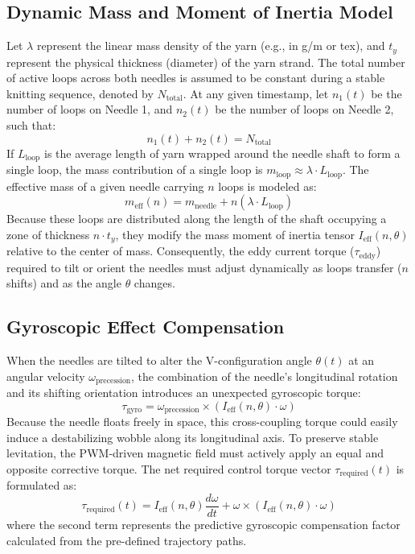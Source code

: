 \documentclass[10pt]{article}
\begin{document}
\subsection{Dynamic Mass and Moment of Inertia Model}
Let $\lambda$ represent the linear mass density of the yarn (e.g., in g/m or tex), and $t_y$ represent the physical thickness (diameter) of the yarn strand. The total number of active loops across both needles is assumed to be constant during a stable knitting sequence, denoted by $N_{\mathrm{total}}$. At any given timestamp, let $n_1(t)$ be the number of loops on Needle 1, and $n_2(t)$ be the number of loops on Needle 2, such that:
\begin{equation}
n_1(t)+n_2(t)=N_{\mathrm{total}}
\tag{2}
\end{equation}
If $L_{\mathrm{loop}}$ is the average length of yarn wrapped around the needle shaft to form a single loop, the mass contribution of a single loop is $m_{\mathrm{loop}}\approx\lambda\cdot L_{\mathrm{loop}}$. The effective mass of a given needle carrying $n$ loops is modeled as:
\begin{equation}
m_{\mathrm{eff}}(n)=m_{\mathrm{needle}}+n(\lambda\cdot L_{\mathrm{loop}})
\tag{3}
\end{equation}
Because these loops are distributed along the length of the shaft occupying a zone of thickness $n\cdot t_y$, they modify the mass moment of inertia tensor $I_{\mathrm{eff}}(n,\theta)$ relative to the center of mass. Consequently, the eddy current torque ($\tau_{\mathrm{eddy}}$) required to tilt or orient the needles must adjust dynamically as loops transfer ($n$ shifts) and as the angle $\theta$ changes.

\subsection{Gyroscopic Effect Compensation}
When the needles are tilted to alter the V-configuration angle $\theta(t)$ at an angular velocity $\omega_{\mathrm{precession}}$, the combination of the needle's longitudinal rotation and its shifting orientation introduces an unexpected gyroscopic torque:
\begin{equation}
\tau_{\mathrm{gyro}}=\omega_{\mathrm{precession}}\times\left(I_{\mathrm{eff}}(n,\theta)\cdot\omega\right)
\tag{4}
\end{equation}
Because the needle floats freely in space, this cross-coupling torque could easily induce a destabilizing wobble along its longitudinal axis. To preserve stable levitation, the PWM-driven magnetic field must actively apply an equal and opposite corrective torque. The net required control torque vector $\tau_{\mathrm{required}}(t)$ is formulated as:
\begin{equation}
\tau_{\mathrm{required}}(t)=I_{\mathrm{eff}}(n,\theta)\frac{d\omega}{dt}+\omega\times\left(I_{\mathrm{eff}}(n,\theta)\cdot\omega\right)
\tag{5}
\end{equation}
where the second term represents the predictive gyroscopic compensation factor calculated from the pre-defined trajectory paths.
\end{document}
